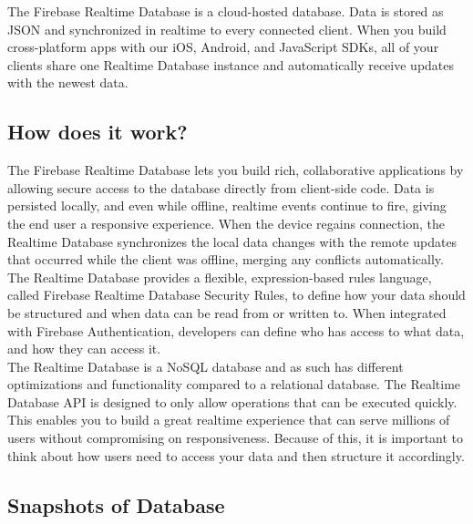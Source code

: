 The Firebase Realtime Database is a cloud-hosted database. Data is stored as JSON and synchronized in realtime to every connected client. When you build cross-platform apps with our iOS, Android, and JavaScript SDKs, all of your clients share one Realtime Database instance and automatically receive updates with the newest data.
\subsection{How does it work?}
The Firebase Realtime Database lets you build rich, collaborative applications by allowing secure access to the database directly from client-side code. Data is persisted locally, and even while offline, realtime events continue to fire, giving the end user a responsive experience. When the device regains connection, the Realtime Database synchronizes the local data changes with the remote updates that occurred while the client was offline, merging any conflicts automatically.\\

The Realtime Database provides a flexible, expression-based rules language, called Firebase Realtime Database Security Rules, to define how your data should be structured and when data can be read from or written to. When integrated with Firebase Authentication, developers can define who has access to what data, and how they can access it.\\

The Realtime Database is a NoSQL database and as such has different optimizations and functionality compared to a relational database. The Realtime Database API is designed to only allow operations that can be executed quickly. This enables you to build a great realtime experience that can serve millions of users without compromising on responsiveness. Because of this, it is important to think about how users need to access your data and then structure it accordingly.

\subsection{Snapshots of Database}

